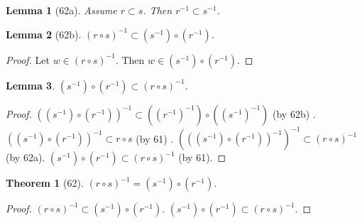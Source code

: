 \documentclass{scrartcl}
\newenvironment{forthel}{\begin{leftbar}}{\end{leftbar}}
\newtheorem*{lemma}{Lemma}
\newtheorem*{theorem}{Theorem}
\begin{document}
\begin{forthel}
\begin{lemma}[62a] Assume $r \subset s$. Then $r^{-1} \subset s^{-1}$.
\end{lemma}

\begin{lemma}[62b] $(r \circ s)^{-1} \subset (s^{-1}) \circ (r^{-1})$.
\end{lemma}
\begin{proof} Let $w \in (r \circ s)^{-1}$.
Then $w \in (s^{-1}) \circ (r^{-1})$.
\end{proof}

\begin{lemma} $(s^{-1}) \circ (r^{-1}) \subset (r \circ s)^{-1}$.
\end{lemma}
\begin{proof}
$((s^{-1}) \circ (r^{-1}))^{-1} \subset 
((r^{-1})^{-1}) \circ ((s^{-1})^{-1})$ (by 62b) .
$((s^{-1}) \circ (r^{-1}))^{-1} \subset 
r \circ s$ (by 61) .
$(((s^{-1}) \circ (r^{-1}))^{-1})^{-1} \subset 
(r \circ s)^{-1}$ (by 62a).
$(s^{-1}) \circ (r^{-1}) \subset (r \circ s)^{-1}$ (by 61).
\end{proof}

\begin{theorem}[62] $(r \circ s)^{-1} = (s^{-1}) \circ (r^{-1})$.
\end{theorem}
\begin{proof} $(r \circ s)^{-1} \subset (s^{-1}) \circ (r^{-1})$.
$(s^{-1}) \circ (r^{-1}) \subset (r \circ s)^{-1}$.
\end{proof}


\end{forthel}
\end{document}
